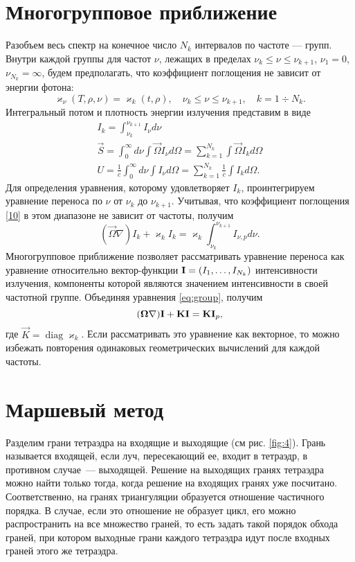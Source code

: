 \section {Многогрупповое приближение}
Разобъем весь спектр на конечное число $N_k$ интервалов по частоте --- групп. Внутри каждой группы для частот $\nu$, лежащих в пределах $\nu_k \leqslant \nu \leqslant \nu_{k+1}$, $\nu_1 = 0$, $\nu_{N_k} = \infty$, будем предполагать, что коэффициент поглощения не зависит от энергии фотона:
\begin {equation}
\varkappa_\nu (T, \rho, \nu) = \varkappa_k(t, \rho), \quad \nu_k \leqslant \nu \leqslant \nu_{k+1}, \quad k = 1 \div N_k.
\label{10}
\end {equation}
Интегральный потом и плотность энергии излучения представим в виде
\begin {gather}
I_k = \int_{\nu_k}^{\nu_{k+1}} I_\nu d \nu\\
\vec S = \int_0^\infty d\nu \int \vec\Omega I_\nu d\Omega = \sum_{k=1}^{N_k} \int \vec\Omega I_k d\Omega\\
U = \frac{1}{c} \int_0^\infty d\nu \int I_\nu d \Omega = \sum_{k=1}^{N_k} \frac{1}{c} \int I_k d \Omega.
\end {gather}
Для определения уравнения, которому удовлетворяет $I_k$, проинтегрируем уравнение переноса по $\nu$ от $\nu_k$ до $\nu_{k+1}$. Учитывая, что коэффициент поглощения \eqref{10} в этом диапазоне не зависит от частоты, получим
\begin {equation}
(\vec\Omega \nabla )I_k + \varkappa_k I_k = \varkappa_k \int_{\nu_k}^{\nu_{k+1}} I_{\nu, p} d \nu.
\label{eq:group}
\end {equation}
Многогрупповое приближение позволяет рассматривать уравнение переноса как уравнение относительно вектор-функции $\avec I = (I_1, \dots, I_{N_k}) $ интенсивности излучения, компоненты которой являются значением интенсивности в своей частотной группе. 
Объединяя уравнения \eqref{eq:group}, получим
\begin {equation}
(\vec\Omega \nabla ) \avec I + \vec K \avec I = \vec K \avec I_{p},
\end {equation} 
где $\vec K = \operatorname{diag} \varkappa_k$. Если рассматривать это уравнение как векторное, то можно избежать повторения одинаковых геометрических вычислений для каждой частоты.
\section{Маршевый метод}
Разделим грани тетраэдра на входящие и выходящие (см рис. \ref{fig:4}). Грань называется входящей, если луч, пересекающий ее, входит в тетраэдр, в противном случае~--- выходящей. Решение на выходящих гранях тетраэдра можно найти только тогда, когда решение на входящих гранях уже посчитано. Соответственно, на гранях триангуляции образуется отношение частичного порядка. В случае, если это отношение не образует цикл, его можно распространить на все множество граней, то есть задать такой порядок обхода граней, при котором выходные грани каждого тетраэдра идут после входных граней этого же тетраэдра. 

